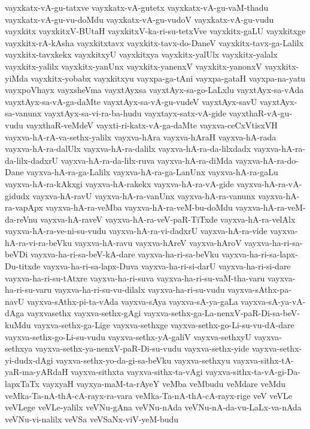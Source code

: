 {vayxkatx-vA-gu-tatxve
vayxkatx-vA-gutetx
vayxkatx-vA-gu-vaM-thadu
vayxkatx-vA-gu-vu-doMdu
vayxkatx-vA-gu-vudoV
vayxkatx-vA-gu-vudu
vayxkitx
vayxkitxV-BUtaH
vayxkitxV-ka-ri-su-tetxVve
vayxkitx-gaLU
vayxkitxge
vayxkitx-rA-kAsha
vayxkitxtavx
vayxkitx-tavx-do-DaneV
vayxkitx-tavx-ga-Lalilx
vayxkitx-tavxkekx
vayxkitxyU
vayxkitxya
vayxkitx-yalUlx
vayxkitx-yalalx
vayxkitx-yalilx
vayxkitx-yanUnx
vayxkitx-yanenxV
vayxkitx-yanonxV
vayxkitx-yiMda
vayxkitx-yobabx
vayxkitxyu
vayxpa-ga-tAni
vayxpa-gataH
vayxpa-na-yatu
vayxpoVhayx
vayxsheVma
vayxtAyxsa
vayxtAyx-sa-go-LaLxlu
vayxtAyx-sa-vAda
vayxtAyx-sa-vA-ga-daMte
vayxtAyx-sa-vA-gu-vudeV
vayxtAyx-savU
vayxtAyx-sa-vanunx
vayxtAyx-sa-vi-ra-ba-hudu
vayxtayx-satx-vA-gide
vayxthaR-vA-gu-vudu
vayxthaR-veMdeV
vayxti-ri-katx-vA-ga-daMte
vayxva-ceCxVtisxVH
vayxva-hA-rA-va-sethx-yalilx
vayxva-hAra
vayxva-hAraH
vayxva-hA-rada
vayxva-hA-ra-dalUlx
vayxva-hA-ra-dalilx
vayxva-hA-ra-da-lilxdadx
vayxva-hA-ra-da-lilx-dadxrU
vayxva-hA-ra-da-lilx-ruva
vayxva-hA-ra-diMda
vayxva-hA-ra-do-Dane
vayxva-hA-ra-ga-Lalilx
vayxva-hA-ra-ga-LanUnx
vayxva-hA-ra-gaLu
vayxva-hA-ra-kAkxgi
vayxva-hA-rakekx
vayxva-hA-ra-vA-gide
vayxva-hA-ra-vA-gidudx
vayxva-hA-ravU
vayxva-hA-ra-vanUnx
vayxva-hA-ra-vanunx
vayxva-hA-ra-vapApx
vayxva-hA-ra-veMba
vayxva-hA-ra-veM-bu-doMdu
vayxva-hA-ra-veM-da-reVnu
vayxva-hA-raveV
vayxva-hA-ra-veV-paR-TiTxde
vayxva-hA-ra-velAlx
vayxva-hA-ra-ve-ni-su-vudu
vayxva-hA-ra-vi-dadxrU
vayxva-hA-ra-vide
vayxva-hA-ra-vi-ra-beVku
vayxva-hA-ravu
vayxva-hAreV
vayxva-hAroV
vayxva-ha-ri-sa-beVDi
vayxva-ha-ri-sa-beV-kA-dare
vayxva-ha-ri-sa-beVku
vayxva-ha-ri-sa-lapx-Du-titxde
vayxva-ha-ri-sa-lapx-Duva
vayxva-ha-ri-si-darU
vayxva-ha-ri-si-dare
vayxva-ha-ri-su-tAtxre
vayxva-ha-ri-suva
vayxva-ha-ri-su-vaM-tha-varu
vayxva-ha-ri-su-varu
vayxva-ha-ri-su-vu-dilalx
vayxva-ha-ri-su-vudu
vayxva-sAthx-pa-navU
vayxva-sAthx-pi-ta-vAda
vayxva-sAya
vayxva-sA-ya-gaLa
vayxva-sA-ya-vA-dAga
vayxvasethx
vayxva-sethx-gAgi
vayxva-sethx-ga-La-nenxV-paR-Di-sa-beV-kuMdu
vayxva-sethx-ga-Lige
vayxva-sethxge
vayxva-sethx-go-Li-su-vu-dA-dare
vayxva-sethx-go-Li-su-vudu
vayxva-sethx-yA-galiV
vayxva-sethxyU
vayxva-sethxya
vayxva-sethx-ya-nenxV-paR-Di-su-vudu
vayxva-sethx-yide
vayxva-sethx-yi-dudx-dAgi
vayxva-sethx-yo-da-gi-sa-beVku
vayxva-sethxyu
vayxva-sithx-tA-yaR-ma-yARdaH
vayxva-sithxta
vayxva-sithx-ta-vAgi
vayxva-sithx-ta-vA-gi-Da-lapxTaTx
vayxyaH
vayxya-maM-ta-rAyeY
veMba
veMbudu
veMdare
veMdu
veMka-Ta-nA-thA-cA-rayx-ra-vara
veMka-Ta-nA-thA-cA-rayx-rige
veV
veVLe
veVLege
veVLe-yalilx
veVNu-gAna
veVNu-nAda
veVNu-nA-da-vu-LaLx-va-nAda
veVNu-vi-nalilx
veVSa
veVSaNx-viV-yeM-budu
}
